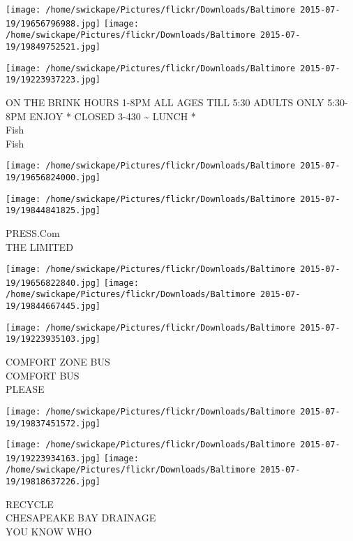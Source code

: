 \documentclass[10pt,letterpaper]{article}
\begin{document}
\texttt{[image: /home/swickape/Pictures/flickr/Downloads/Baltimore 2015-07-19/19656796988.jpg]}
\texttt{[image: /home/swickape/Pictures/flickr/Downloads/Baltimore 2015-07-19/19849752521.jpg]}

\vspace{0.25in}
\texttt{[image: /home/swickape/Pictures/flickr/Downloads/Baltimore 2015-07-19/19223937223.jpg]}

ON THE BRINK HOURS 1{-}8PM ALL AGES TILL 5:30 ADULTS ONLY 5:30{-}8PM ENJOY * CLOSED 3{-}430 \textasciitilde{} LUNCH *\\
Fish\\
Fish\\
\pagebreak

\texttt{[image: /home/swickape/Pictures/flickr/Downloads/Baltimore 2015-07-19/19656824000.jpg]}

\vspace{0.25in}
\texttt{[image: /home/swickape/Pictures/flickr/Downloads/Baltimore 2015-07-19/19844841825.jpg]}

PRESS.Com\\
THE LIMITED\\
\pagebreak

\texttt{[image: /home/swickape/Pictures/flickr/Downloads/Baltimore 2015-07-19/19656822840.jpg]}
\texttt{[image: /home/swickape/Pictures/flickr/Downloads/Baltimore 2015-07-19/19844667445.jpg]}

\vspace{0.25in}
\texttt{[image: /home/swickape/Pictures/flickr/Downloads/Baltimore 2015-07-19/19223935103.jpg]}

COMFORT ZONE BUS\\
COMFORT BUS\\
PLEASE\\
\pagebreak

\texttt{[image: /home/swickape/Pictures/flickr/Downloads/Baltimore 2015-07-19/19837451572.jpg]}

\vspace{0.25in}
\texttt{[image: /home/swickape/Pictures/flickr/Downloads/Baltimore 2015-07-19/19223934163.jpg]}
\texttt{[image: /home/swickape/Pictures/flickr/Downloads/Baltimore 2015-07-19/19818637226.jpg]}

RECYCLE\\
CHESAPEAKE BAY DRAINAGE\\
YOU KNOW WHO\\
\pagebreak
\end{document}
